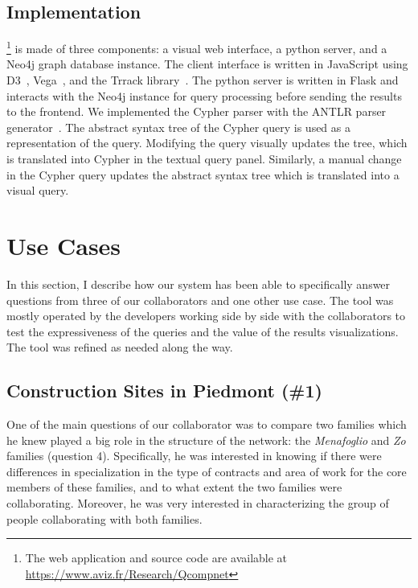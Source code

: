 \subsection{Implementation}

\name\footnote{The web application and source code are available at \url{https://www.aviz.fr/Research/Qcompnet}} is made of three components: a visual web interface, a python server, and a Neo4j\cite{neo4j} graph database instance.
The client interface is written in JavaScript using D3~\cite{d3}, Vega~\cite{satyanarayan2016vega}, and the Trrack library~\cite{cutlerTrrackLibraryProvenanceTracking2020}.
The python server is written in Flask and interacts with the Neo4j instance for query processing before sending the results to the frontend.
We implemented the Cypher parser with the ANTLR parser generator~\cite{parr1995antlr}.
The abstract syntax tree of the Cypher query is used as a representation of the query.
Modifying the query visually updates the tree, which is translated into Cypher in the textual query panel.
Similarly, a manual change in the Cypher query updates the abstract syntax tree which is translated into a visual query.



\section{Use Cases}\label{sec:combinet-usecases}

In this section, I describe how our system has been able to specifically answer questions from three of our collaborators and one other use case.
The tool was mostly operated by the developers working side by side with the collaborators to test the expressiveness of the queries and the value of the results visualizations.
The tool was refined as needed along the way.


\subsection{Construction Sites in Piedmont (\#1)}

One of the main questions of our collaborator was to compare two families which he knew played a big role in the structure of the network: the \textit{Menafoglio} and \textit{Zo} families (question 4).
Specifically, he was interested in knowing if there were differences in specialization in the type of contracts and area of work for the core members of these families, and to what extent the two families were collaborating.
Moreover, he was very interested in characterizing the group of people collaborating with both families.

